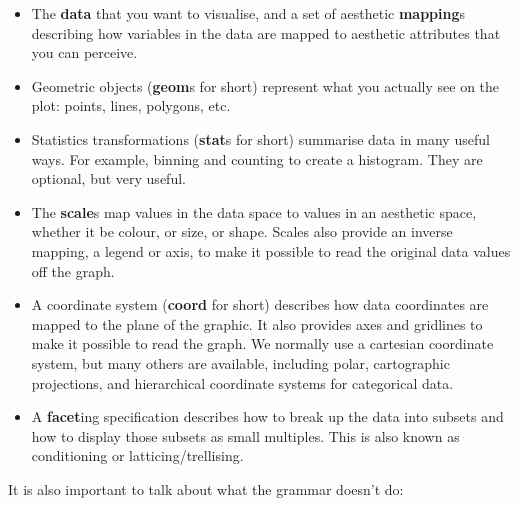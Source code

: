 \begin{itemize}
  \item The \textbf{data} that you want to visualise, and a set of aesthetic \textbf{mapping}s describing how variables in the data are mapped to aesthetic attributes that you can perceive.

  \item Geometric objects (\textbf{geom}s for short) represent what you actually see on the plot: points, lines, polygons, etc.

  \item Statistics transformations (\textbf{stat}s for short) summarise data in many useful ways.  For example, binning and counting to create a histogram.  They are optional, but very useful.

  \item The \textbf{scale}s map values in the data space to values in an aesthetic space, whether it be colour, or size, or shape.  Scales also provide an inverse mapping, a legend or axis, to make it possible to read the original data values off the graph.

  \item A coordinate system (\textbf{coord} for short) describes how data coordinates are mapped to the plane of the graphic.  It also provides axes and gridlines to make it possible to read the graph.  We normally use a cartesian coordinate system, but many others are available, including polar, cartographic projections, and hierarchical coordinate systems for categorical data.

  \item A \textbf{facet}ing specification describes how to break up the data into subsets and how to display those subsets as small multiples.  This is also known as conditioning or latticing/trellising.

\end{itemize}

It is also important to talk about what the grammar doesn't do:

